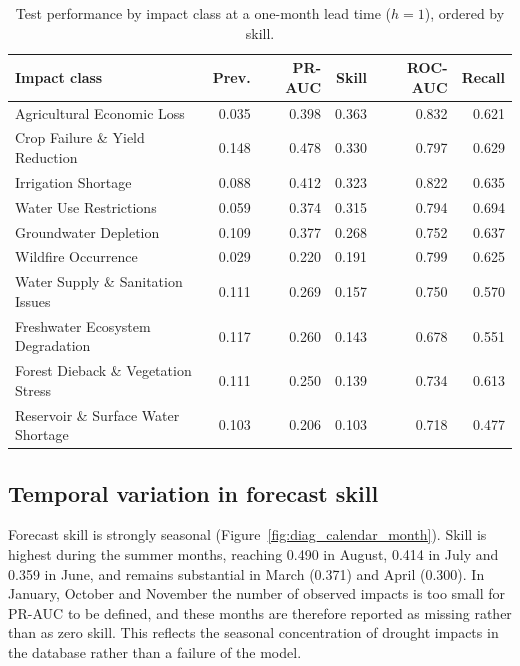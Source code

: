 \begin{table}[h]
\centering
\small
\caption{Test performance by impact class at a one-month lead time ($h=1$), ordered by skill.}
\label{tab:test_class}
\begin{tabular}{p{6.2cm} rrrrr}
\toprule
\textbf{Impact class} & \textbf{Prev.} & \textbf{PR-AUC} & \textbf{Skill} & \textbf{ROC-AUC} & \textbf{Recall} \\
\midrule
Agricultural Economic Loss          & 0.035 & 0.398 & 0.363 & 0.832 & 0.621 \\
Crop Failure \& Yield Reduction     & 0.148 & 0.478 & 0.330 & 0.797 & 0.629 \\
Irrigation Shortage                 & 0.088 & 0.412 & 0.323 & 0.822 & 0.635 \\
Water Use Restrictions              & 0.059 & 0.374 & 0.315 & 0.794 & 0.694 \\
Groundwater Depletion               & 0.109 & 0.377 & 0.268 & 0.752 & 0.637 \\
Wildfire Occurrence                 & 0.029 & 0.220 & 0.191 & 0.799 & 0.625 \\
Water Supply \& Sanitation Issues   & 0.111 & 0.269 & 0.157 & 0.750 & 0.570 \\
Freshwater Ecosystem Degradation    & 0.117 & 0.260 & 0.143 & 0.678 & 0.551 \\
Forest Dieback \& Vegetation Stress & 0.111 & 0.250 & 0.139 & 0.734 & 0.613 \\
Reservoir \& Surface Water Shortage & 0.103 & 0.206 & 0.103 & 0.718 & 0.477 \\
\bottomrule
\end{tabular}
\end{table}

\subsection{Temporal variation in forecast skill}

Forecast skill is strongly seasonal (Figure~\ref{fig:diag_calendar_month}).
Skill is highest during the summer months, reaching 0.490 in August, 0.414 in
July and 0.359 in June, and remains substantial in March (0.371) and April
(0.300). In January, October and November the number of observed impacts is too
small for PR-AUC to be defined, and these months are therefore reported as
missing rather than as zero skill. This reflects the seasonal concentration of
drought impacts in the database rather than a failure of the model.

